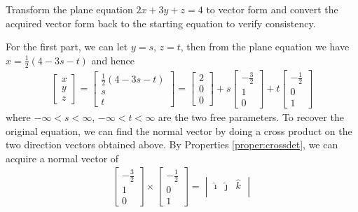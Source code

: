 \begin{exmp}
\label{exmp:vecgeohighdim}
Transform the plane equation $2x+3y+z = 4$ to vector form and convert the acquired vector form back to the starting equation to verify consistency.
\end{exmp}
\begin{solution}
For the first part, we can let $y=s$, $z=t$, then from the plane equation we have $x = \frac{1}{2}(4-3s-t)$ and hence
\begin{align*}
\begin{bmatrix}
x \\
y \\
z
\end{bmatrix}
=
\begin{bmatrix}
\frac{1}{2}(4-3s-t) \\
s \\
t
\end{bmatrix}
=
\begin{bmatrix}
2 \\
0 \\
0
\end{bmatrix}
+ s
\begin{bmatrix}
-\frac{3}{2} \\
1 \\
0
\end{bmatrix}
+ t
\begin{bmatrix}
-\frac{1}{2} \\
0 \\
1
\end{bmatrix}
\end{align*}
where $-\infty < s < \infty$, $-\infty < t < \infty$ are the two free parameters. To recover the original equation, we can find the normal vector by doing a cross product on the two direction vectors obtained above. By Properties \ref{proper:crossdet}, we can acquire a normal vector of
\begin{align*}
\begin{bmatrix}
-\frac{3}{2} \\
1 \\
0
\end{bmatrix}
\times
\begin{bmatrix}
-\frac{1}{2} \\
0 \\
1
\end{bmatrix}
=
\begin{vmatrix}
\hat{\imath} & \hat{\jmath} & \hat{k} \\

\end{vmatrix}
\end{align*}
\end{solution}
